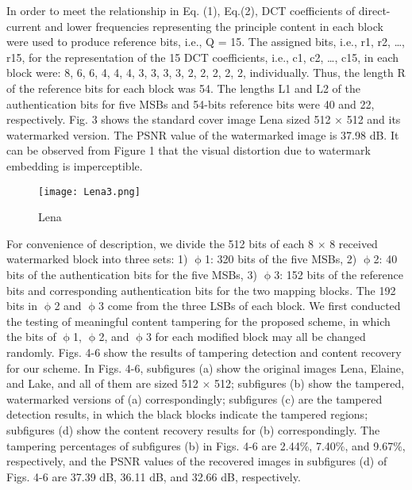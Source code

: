 \documentclass[a4paper, 12pt]{gji}
\begin{document}
In order to meet the relationship in Eq. (1), Eq.(2), DCT coefficients of direct-current and lower frequencies representing the principle content in each block were used to produce reference bits, i.e., Q = 15. The assigned bits, i.e., r1, r2, …, r15, for the representation of the 15 DCT coefficients, i.e., c1, c2, …, c15, in each block were: 8, 6, 6, 4, 4, 4, 3, 3, 3, 3, 2, 2, 2, 2, 2, individually. Thus, the length R of the reference bits for each block was 54. The lengths L1 and L2 of the authentication bits for five MSBs and 54-bits reference bits were 40 and 22, respectively. Fig. 3 shows the standard cover image Lena sized 512 $\times$ 512 and its watermarked version. The PSNR value of the watermarked image is 37.98 dB. It can be observed from Figure 1 that the visual distortion due to watermark embedding is imperceptible.

\begin{figure}[H]
    \centering
    \texttt{[image: Lena3.png]}
    \caption{Lena}
    \label{Lena}
\end{figure}

For convenience of description, we divide the 512 bits of each 8 $\times$ 8 received watermarked block into three sets: 1) $\upphi$1: 320 bits of the five MSBs, 2) $\upphi$2: 40 bits of the authentication bits for the five MSBs, 3) $\upphi$3: 152 bits of the reference bits and corresponding authentication bits for the two mapping blocks. The 192 bits in $\upphi$2 and $\upphi$3 come from the three LSBs of each block. We first conducted the testing of meaningful content tampering for the proposed scheme, in which the bits of $\upphi$1, $\upphi$2, and $\upphi$3 for each modified block may all be changed randomly. Figs. 4-6 show the results of tampering detection and content recovery for our scheme. In Figs. 4-6, subfigures (a) show the original images Lena, Elaine, and Lake, and all of them are sized 512 $\times$ 512; subfigures (b) show the tampered, watermarked versions of (a) correspondingly; subfigures (c) are the tampered detection results, in which the black blocks indicate the tampered regions; subfigures (d) show the content recovery results for (b) correspondingly. The tampering percentages of subfigures (b) in Figs. 4-6 are 2.44\%, 7.40\%, and 9.67\%, respectively, and the PSNR values of the recovered images in subfigures (d) of Figs. 4-6 are 37.39 dB, 36.11 dB, and 32.66 dB, respectively. 
\end{document}
